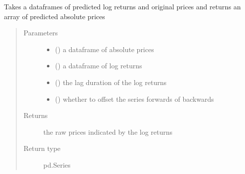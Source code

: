 \documentclass[letterpaper,10pt,english]{sphinxmanual}
\begin{document}
\begin{fulllineitems}
\label{\detokenize{index:Src.utils.inverse_log_returns}}
Takes a dataframes of predicted log returns and original
prices and returns an array of predicted absolute prices
\begin{quote}\begin{description}
\item[{Parameters}] \leavevmode\begin{itemize}
\item {} 
 () \textendash{} a dataframe of absolute prices

\item {} 
 () \textendash{} a dataframe of log returns

\item {} 
 () \textendash{} the lag duration of the log returns

\item {} 
 () \textendash{} whether to offset the series forwards of backwards

\end{itemize}

\item[{Returns}] \leavevmode
the raw prices indicated by the log returns

\item[{Return type}] \leavevmode
pd.Series

\end{description}\end{quote}

\end{fulllineitems}

\end{document}
